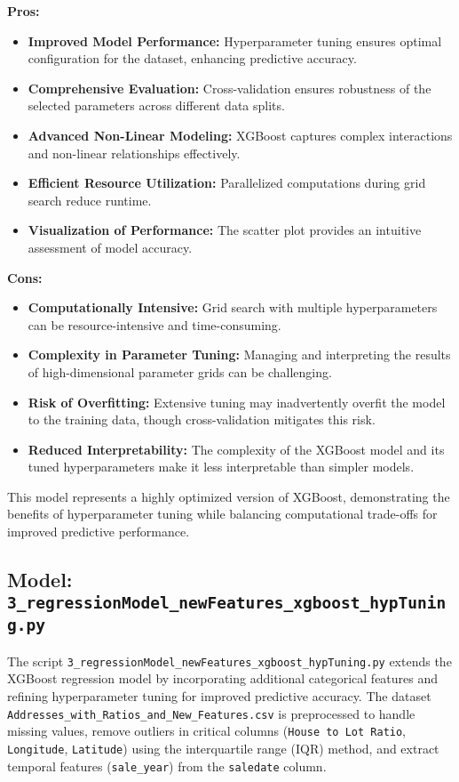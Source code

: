 \textbf{Pros:}
\begin{itemize}
    \item \textbf{Improved Model Performance:} Hyperparameter tuning ensures optimal configuration for the dataset, enhancing predictive accuracy.
    \item \textbf{Comprehensive Evaluation:} Cross-validation ensures robustness of the selected parameters across different data splits.
    \item \textbf{Advanced Non-Linear Modeling:} XGBoost captures complex interactions and non-linear relationships effectively.
    \item \textbf{Efficient Resource Utilization:} Parallelized computations during grid search reduce runtime.
    \item \textbf{Visualization of Performance:} The scatter plot provides an intuitive assessment of model accuracy.
\end{itemize}

\textbf{Cons:}
\begin{itemize}
    \item \textbf{Computationally Intensive:} Grid search with multiple hyperparameters can be resource-intensive and time-consuming.
    \item \textbf{Complexity in Parameter Tuning:} Managing and interpreting the results of high-dimensional parameter grids can be challenging.
    \item \textbf{Risk of Overfitting:} Extensive tuning may inadvertently overfit the model to the training data, though cross-validation mitigates this risk.
    \item \textbf{Reduced Interpretability:} The complexity of the XGBoost model and its tuned hyperparameters make it less interpretable than simpler models.
\end{itemize}

This model represents a highly optimized version of XGBoost, demonstrating the benefits of hyperparameter tuning while balancing computational trade-offs for improved predictive performance. \\

\hrulefill

\subsection{Model: \texttt{3\_regressionModel\_newFeatures\_xgboost\_hypTuning.py}}

The script \texttt{3\_regressionModel\_newFeatures\_xgboost\_hypTuning.py} extends the XGBoost regression model by incorporating additional categorical features and refining hyperparameter tuning for improved predictive accuracy. The dataset \texttt{Addresses\_with\_Ratios\_and\_New\_Features.csv} is preprocessed to handle missing values, remove outliers in critical columns (\texttt{House to Lot Ratio}, \texttt{Longitude}, \texttt{Latitude}) using the interquartile range (IQR) method, and extract temporal features (\texttt{sale\_year}) from the \texttt{saledate} column.


